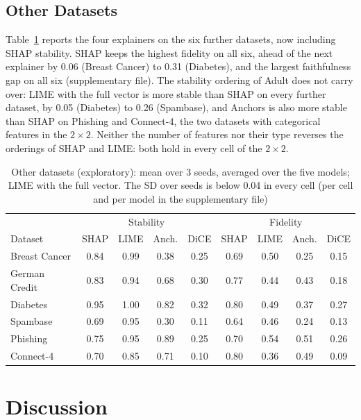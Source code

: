 \documentclass[11pt,a4paper]{article}
\begin{document}
\subsection{Other Datasets}
\label{sec:cross}

Table~\ref{tab:cross} reports the four explainers on the six further
datasets, now including SHAP stability. SHAP keeps the highest fidelity
on all six, ahead of the next explainer by 0.06 (Breast Cancer) to 0.31
(Diabetes), and the largest faithfulness gap on all six (supplementary
file). The stability ordering of Adult does not carry over: LIME with the
full vector is more stable than SHAP on every further dataset, by 0.05
(Diabetes) to 0.26 (Spambase), and Anchors is also more stable than SHAP on
Phishing and Connect-4, the two datasets with categorical features in the
$2 \times 2$. Neither the number of features nor their type reverses the
orderings of SHAP and LIME: both hold in every cell of the $2 \times 2$.

\begin{table}[htb]
\centering
\caption{Other datasets (exploratory): mean over 3 seeds, averaged over the
five models; LIME with the full vector. The SD over seeds is below 0.04 in
every cell (per cell and per model in the supplementary file)}
\label{tab:cross}
\begin{tabular}{lcccccccc}
\toprule
 & \multicolumn{4}{c}{Stability} & \multicolumn{4}{c}{Fidelity} \\
Dataset & SHAP & LIME & Anch. & DiCE & SHAP & LIME & Anch. & DiCE \\
\midrule
Breast Cancer & 0.84 & 0.99 & 0.38 & 0.25 & 0.69 & 0.50 & 0.25 & 0.15 \\
German Credit & 0.83 & 0.94 & 0.68 & 0.30 & 0.77 & 0.44 & 0.43 & 0.18 \\
Diabetes & 0.95 & 1.00 & 0.82 & 0.32 & 0.80 & 0.49 & 0.37 & 0.27 \\
Spambase & 0.69 & 0.95 & 0.30 & 0.11 & 0.64 & 0.46 & 0.24 & 0.13 \\
Phishing & 0.75 & 0.95 & 0.89 & 0.25 & 0.70 & 0.54 & 0.51 & 0.26 \\
Connect-4 & 0.70 & 0.85 & 0.71 & 0.10 & 0.80 & 0.36 & 0.49 & 0.09 \\
\bottomrule
\end{tabular}
\end{table}

\section{Discussion}
\label{sec:discussion}
\end{document}
